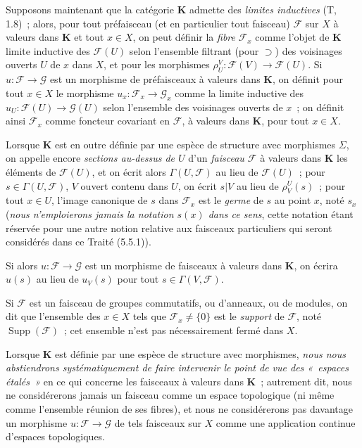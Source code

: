 \begin{env}[3.1.6]
\label{0.3.1.6-fr}
Supposons maintenant que la catégorie $\mathbf{K}$ admette des \emph{limites
inductives} (T, 1.8)~; alors, pour tout préfaisceau (et en particulier tout
faisceau) $\mathcal{F}$ sur $X$ à valeurs dans $\mathbf{K}$ et tout $x\in X$,
on peut définir la \emph{fibre} $\mathcal{F}_x$ comme l'objet de $\mathbf{K}$
limite inductive des $\mathcal{F}(U)$ selon l'ensemble filtrant (pour
$\supset$) des voisinages ouverts $U$ de $x$ dans $X$, et pour les morphismes
$\rho_U^V:\mathcal{F}(V)\to\mathcal{F}(U)$. Si
$u:\mathcal{F}\to\mathcal{G}$ est un morphisme de préfaisceaux à valeurs dans
$\mathbf{K}$, on définit pour tout $x\in X$ le morphisme
$u_x:\mathcal{F}_x\to\mathcal{G}_x$ comme la limite inductive des
$u_U:\mathcal{F}(U)\to\mathcal{G}(U)$ selon l'ensemble des voisinages ouverts
de $x$~; on définit ainsi $\mathcal{F}_x$ comme foncteur covariant en
$\mathcal{F}$, à valeurs dans $\mathbf{K}$, pour tout $x\in X$.

Lorsque $\mathbf{K}$ est en outre définie par une espèce de structure avec
morphismes $\Sigma$, on appelle encore \emph{sections au-dessus de $U$} d'un
\emph{faisceau $\mathcal{F}$} à valeurs dans $\mathbf{K}$ les éléments de
$\mathcal{F}(U)$, et on écrit alors $\Gamma(U,\mathcal{F})$ au lieu de
$\mathcal{F}(U)$~; pour $s\in\Gamma(U,\mathcal{F})$, $V$ ouvert contenu dans
$U$, on écrit $s|V$ au lieu de $\rho_V^U(s)$~; pour tout $x\in U$, l'image
canonique de $s$ dans $\mathcal{F}_x$ est le \emph{germe} de $s$ au point $x$,
noté $s_x$ (\emph{nous n'emploierons jamais la notation $s(x)$ dans ce sens},
cette notation étant réservée pour une autre notion relative aux faisceaux
particuliers qui seront considérés dans ce Traité (5.5.1)).

Si alors $u:\mathcal{F}\to\mathcal{G}$ est un morphisme de faisceaux à valeurs
dans $\mathbf{K}$, on écrira $u(s)$ au lieu de $u_V(s)$ pour tout
$s\in\Gamma(V,\mathcal{F})$.

Si $\mathcal{F}$ est un faisceau de groupes commutatifs, ou d'anneaux, ou de
modules, on dit que l'ensemble des $x\in X$ tels que
$\mathcal{F}_x\neq\{0\}$ est le \emph{support} de $\mathcal{F}$, noté
$\operatorname{Supp}(\mathcal{F})$~; cet ensemble n'est pas nécessairement
fermé dans $X$.

Lorsque $\mathbf{K}$ est définie par une espèce de structure avec morphismes,
\emph{nous nous abstiendrons systématiquement de faire intervenir le point de
vue des «~espaces étalés~»} en ce qui concerne les faisceaux à valeurs dans
$\mathbf{K}$~; autrement dit, nous ne considérerons jamais un faisceau comme
un espace topologique (ni même comme l'ensemble réunion de ses fibres), et
nous ne considérerons pas davantage un morphisme
$u:\mathcal{F}\to\mathcal{G}$ de tels faisceaux sur $X$ comme une application
continue d'espaces topologiques.
\end{env}

